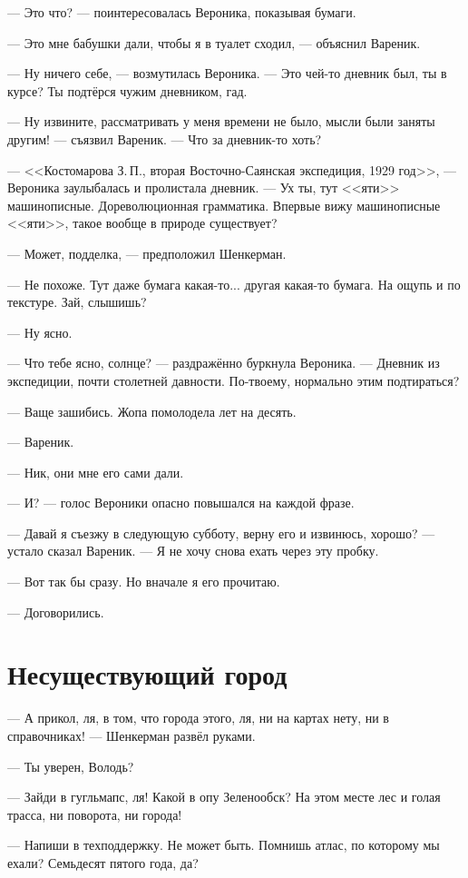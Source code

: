 \documentclass[a4paper,10pt,fleqn]{book}\usepackage{polyglossia}\setdefaultlanguage{english}\setotherlanguage{russian}\defaultfontfeatures{Ligatures=TeX,Mapping=tex-text} \usepackage{xcolor}\definecolor{lightgray}{HTML}{bbbbbb}\color{lightgray}\newcommand{\ml}[3]{\textcolor{black}{#3}}
\begin{document}
--- Это что? --- поинтересовалась Вероника, показывая бумаги.

--- Это мне бабушки дали, чтобы я в туалет сходил, --- объяснил Вареник.

--- Ну ничего себе, --- возмутилась Вероника.
--- Это чей-то дневник был, ты в курсе?
Ты подтёрся чужим дневником, гад.

--- Ну извините, рассматривать у меня времени не было, мысли были заняты другим! --- съязвил Вареник.
--- Что за дневник-то хоть?

--- <<Костомарова З.\,П., вторая Восточно-Саянская экспедиция, 1929 год>>, --- Вероника заулыбалась и пролистала дневник.
--- Ух ты, тут <<яти>> машинописные.
Дореволюционная грамматика.
Впервые вижу машинописные <<яти>>, такое вообще в природе существует?

--- Может, подделка, --- предположил Шенкерман.

--- Не похоже.
Тут даже бумага какая-то... другая какая-то бумага.
На ощупь и по текстуре.
Зай, слышишь?

--- Ну ясно.

--- Что тебе ясно, солнце? --- раздражённо буркнула Вероника.
--- Дневник из экспедиции, почти столетней давности.
По-твоему, нормально этим подтираться?

--- Ваще зашибись.
Жопа помолодела лет на десять.

--- Вареник.

--- Ник, они мне его сами дали.

--- И? --- голос Вероники опасно повышался на каждой фразе.

--- Давай я съезжу в следующую субботу, верну его и извинюсь, хорошо? --- устало сказал Вареник.
--- Я не хочу снова ехать через эту пробку.

--- Вот так бы сразу.
Но вначале я его прочитаю.

--- Договорились.

\section{Несуществующий город}

--- А прикол, ля, в том, что города этого, ля, ни на картах нету, ни в справочниках! --- Шенкерман развёл руками.

--- Ты уверен, Володь?

--- Зайди в гугльмапс, ля!
Какой в опу Зеленообск?
На этом месте лес и голая трасса, ни поворота, ни города!

--- Напиши в техподдержку.
Не может быть.
Помнишь атлас, по которому мы ехали?
Семьдесят пятого года, да?
\end{document}
